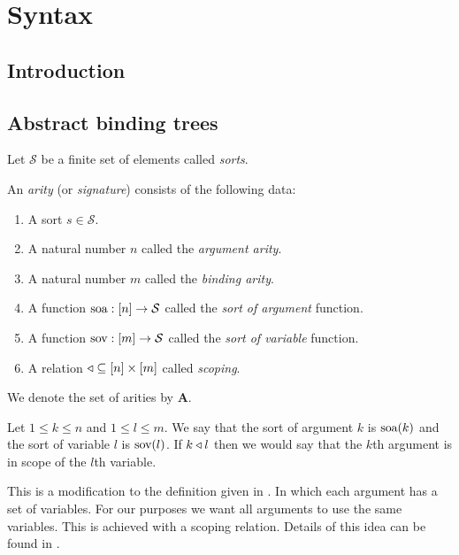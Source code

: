 \section{Syntax}

\subsection{Introduction}

\subsection{Abstract binding trees}

\begin{defin}[Sorts]
    Let $\mathcal{S}$ be a finite set of elements called \emph{sorts}.
\end{defin}

\begin{defin}[Arity]
    An \emph{arity} (or \emph{signature}) consists of the following data:
    \begin{enumerate}
        \setlength{\itemsep}{0pt}
        \item A sort $s \in \mathcal{S}$.
        \item A natural number $n$ called the \emph{argument arity}.
        \item A natural number $m$ called the \emph{binding arity}.
        \item A function $\text{soa} : [n] \to \mathcal{S}$ called the \emph{sort of argument} function.
        \item A function $\text{sov} : [m] \to \mathcal{S}$ called the \emph{sort of variable} function.
        \item A relation $\triangleleft \subseteq [n] \times [m]$ called \emph{scoping}.
    \end{enumerate}
    We denote the set of arities by $\mathbf{A}$.
\end{defin}

\begin{remark}
    Let $1 \le k \le n$ and $1 \le l \le m$. We say that the sort of argument $k$ is $\text{soa}(k)$ and the sort of variable $l$ is $\text{sov}(l)$. If $k \triangleleft l$ then we would say that the $k$th argument is in scope of the $l$th variable.
\end{remark}

\begin{remark}
    This is a modification to the definition given in \cite{harper_2016}. In which each argument has a set of variables. For our purposes we want all arguments to use the same variables. This is achieved with a scoping relation. Details of this idea can be found in \cite{nlab:initiality_project_-_raw_syntax}.
\end{remark}

